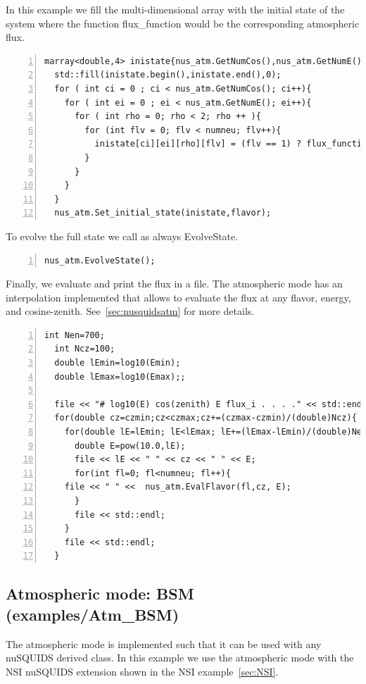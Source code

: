 \documentclass[3p,12pt]{elsarticle}
\newcommand{\ttf}{\ttfamily}
\begin{document}
In this example we fill the multi-dimensional array with the initial state of the
system where the function {\ttf flux\_function} would be the corresponding
atmospheric flux.

\begin{lstlisting}[frame=leftline, numbers =
  left,breaklines=true,label = ex:sin1,firstnumber=last]
  marray<double,4> inistate{nus_atm.GetNumCos(),nus_atm.GetNumE(),2,numneu};
  std::fill(inistate.begin(),inistate.end(),0);
  for ( int ci = 0 ; ci < nus_atm.GetNumCos(); ci++){
    for ( int ei = 0 ; ei < nus_atm.GetNumE(); ei++){
      for ( int rho = 0; rho < 2; rho ++ ){
        for (int flv = 0; flv < numneu; flv++){
          inistate[ci][ei][rho][flv] = (flv == 1) ? flux_function(e_range[ei], cz_range[ci]) : 0.0;//set 1 only to the muon flavor
        }
      }
    }
  }
  nus_atm.Set_initial_state(inistate,flavor);
\end{lstlisting}

To evolve the full state we call as always {\ttf EvolveState}. 

\begin{lstlisting}[frame=leftline, numbers =
  left,breaklines=true,label = ex:sin1,firstnumber=last]
nus_atm.EvolveState();
\end{lstlisting}

Finally, we evaluate and print the flux in a file. The
atmospheric mode has an interpolation implemented that allows to
evaluate the flux at any flavor, energy, and cosine-zenith. See~\ref{sec:nusquidsatm}
for more details.

\begin{lstlisting}[frame=leftline, numbers =
  left,breaklines=true,label = ex:sin1,firstnumber=last]
  int Nen=700;
  int Ncz=100;
  double lEmin=log10(Emin);
  double lEmax=log10(Emax);;

  file << "# log10(E) cos(zenith) E flux_i . . . ." << std::endl;
  for(double cz=czmin;cz<czmax;cz+=(czmax-czmin)/(double)Ncz){
    for(double lE=lEmin; lE<lEmax; lE+=(lEmax-lEmin)/(double)Nen){
      double E=pow(10.0,lE);
      file << lE << " " << cz << " " << E;
      for(int fl=0; fl<numneu; fl++){
	file << " " <<  nus_atm.EvalFlavor(fl,cz, E);
      }
      file << std::endl;
    }
    file << std::endl;
  }
\end{lstlisting}


\subsection{Atmospheric mode: BSM \textnormal{({\ttf examples/Atm\_BSM})}}
\label{sec:atmBSM}
The atmospheric mode is implemented such  that it can be used with any
nuSQUIDS derived class. In this example we use the atmospheric mode
with the NSI nuSQUIDS extension shown in the NSI example~\ref{sec:NSI}.
\end{document}
